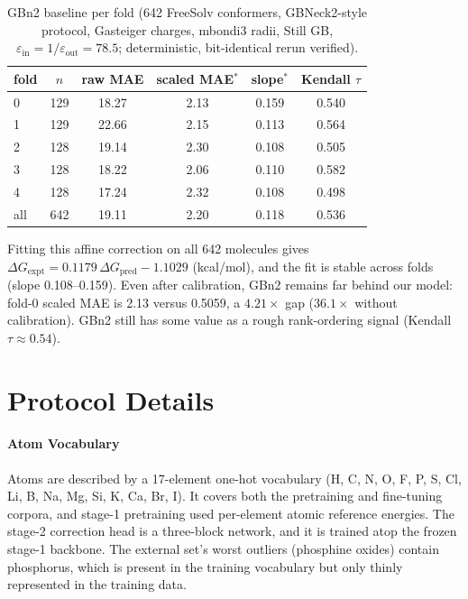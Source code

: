 \documentclass{article}
\begin{document}
\begin{table}[h]
  \caption{GBn2 baseline per fold (642 FreeSolv conformers, GBNeck2-style
  protocol, Gasteiger charges, mbondi3 radii, Still GB,
  $\varepsilon_{\text{in}} = 1/\varepsilon_{\text{out}} = 78.5$;
  deterministic, bit-identical rerun verified).}
  \label{tab:gbn2}
  \centering
  \setlength{\tabcolsep}{5pt}
  \begin{tabular}{l@{\hspace{6pt}}ccccc}
    \toprule
    fold & $n$ & raw MAE & scaled MAE$^\ast$ & slope$^\ast$ & Kendall $\tau$ \\
    \midrule
    0 & 129 & 18.27 & 2.13 & 0.159 & 0.540 \\
    1 & 129 & 22.66 & 2.15 & 0.113 & 0.564 \\
    2 & 128 & 19.14 & 2.30 & 0.108 & 0.505 \\
    3 & 128 & 18.22 & 2.06 & 0.110 & 0.582 \\
    4 & 128 & 17.24 & 2.32 & 0.108 & 0.498 \\
    \midrule
    all & 642 & 19.11 & 2.20 & 0.118 & 0.536 \\
    \bottomrule
  \end{tabular}
\end{table}

Fitting this affine correction on all 642 molecules gives
$\Delta G_{\text{expt}} = 0.1179\,\Delta G_{\text{pred}} - 1.1029$
(kcal/mol), and the fit is stable across folds (slope 0.108--0.159). Even
after calibration, GBn2 remains far behind our model: fold-0 scaled MAE is
2.13 versus 0.5059, a $4.21\times$ gap ($36.1\times$ without calibration).
GBn2 still has some value as a rough rank-ordering signal (Kendall
$\tau\approx0.54$).

\section{Protocol Details}
\label{app:protocol}

\paragraph{Atom Vocabulary} Atoms are described by a 17-element one-hot
vocabulary (H, C, N, O, F, P, S, Cl, Li, B, Na, Mg, Si, K, Ca, Br, I). It
covers both the pretraining and fine-tuning corpora, and stage-1 pretraining
used per-element atomic reference energies. The stage-2 correction head is a
three-block network, and it is trained atop the frozen stage-1 backbone. The external set's worst outliers (phosphine oxides) contain phosphorus,
which is present in the training vocabulary but only thinly represented in
the training data.
\end{document}
